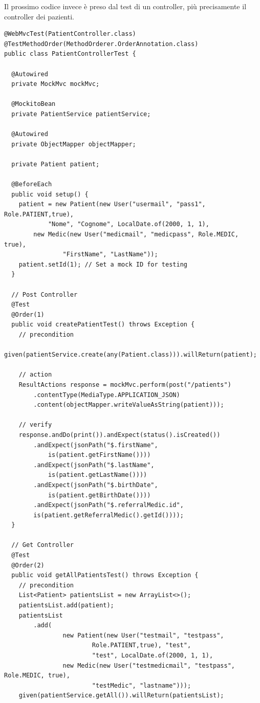 \documentclass[a4paper]{article}
\begin{document}
\noindent
Il prossimo codice invece è preso dal test di un controller, più precisamente il controller dei pazienti.
\begin{verbatim}
@WebMvcTest(PatientController.class)
@TestMethodOrder(MethodOrderer.OrderAnnotation.class)
public class PatientControllerTest {

  @Autowired
  private MockMvc mockMvc;

  @MockitoBean
  private PatientService patientService;

  @Autowired
  private ObjectMapper objectMapper;

  private Patient patient;

  @BeforeEach
  public void setup() {
    patient = new Patient(new User("usermail", "pass1", Role.PATIENT,true),
            "Nome", "Cognome", LocalDate.of(2000, 1, 1),
        new Medic(new User("medicmail", "medicpass", Role.MEDIC, true),
                "FirstName", "LastName"));
    patient.setId(1); // Set a mock ID for testing
  }

  // Post Controller
  @Test
  @Order(1)
  public void createPatientTest() throws Exception {
    // precondition
    given(patientService.create(any(Patient.class))).willReturn(patient);

    // action
    ResultActions response = mockMvc.perform(post("/patients")
        .contentType(MediaType.APPLICATION_JSON)
        .content(objectMapper.writeValueAsString(patient)));

    // verify
    response.andDo(print()).andExpect(status().isCreated())
        .andExpect(jsonPath("$.firstName",
            is(patient.getFirstName())))
        .andExpect(jsonPath("$.lastName",
            is(patient.getLastName())))
        .andExpect(jsonPath("$.birthDate",
            is(patient.getBirthDate())))
        .andExpect(jsonPath("$.referralMedic.id", 
        is(patient.getReferralMedic().getId())));
  }

  // Get Controller
  @Test
  @Order(2)
  public void getAllPatientsTest() throws Exception {
    // precondition
    List<Patient> patientsList = new ArrayList<>();
    patientsList.add(patient);
    patientsList
        .add(
                new Patient(new User("testmail", "testpass", 
                        Role.PATIENT,true), "test",
                        "test", LocalDate.of(2000, 1, 1),
                new Medic(new User("testmedicmail", "testpass", Role.MEDIC, true),
                        "testMedic", "lastname")));
    given(patientService.getAll()).willReturn(patientsList);


\end{verbatim}
\end{document}
